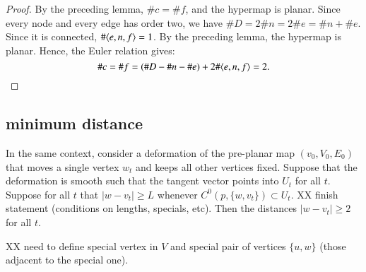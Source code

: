 \begin{proof} By the preceding lemma, $\# c = \#f$, and the
hypermap is planar.  Since every node and every edge has order two,
we have $\#D = 2\#n = 2\# e = \#n +\#e$.  Since it is connected,
$\#\langle e,n,f\rangle = 1$.  By the preceding lemma, the hypermap is
planar. Hence, the Euler relation gives:
    $$
    \#c = \#f = (\#D - \#n - \#e) + 2\#\langle e,n,f\rangle =2.
    $$
\end{proof}




\subsection{minimum distance}

\begin{lemma}\label{dist2} In the same context, consider a deformation
of the pre-planar map $(v_0,V_0,E_0)$ that moves a single vertex $w_t$
and keeps all other vertices fixed.  Suppose that the deformation is
smooth such that the tangent vector points into $U_t$ for all $t$.
Suppose for all $t$ that $|w-v_t| \ge L$ whenever
$C^0(p,\{w,v_t\})\subset U_t$.
XX finish statement (conditions on lengths, specials, etc).   
Then the distances $|w-v_t|\ge 2$ for all
$t$.
\end{lemma}

XX need to define special vertex in $V$ and special pair
of vertices $\{u,w\}$ (those adjacent to the special one).


